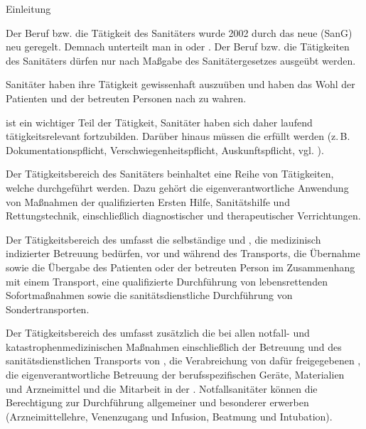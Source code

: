 \Text
{Einleitung}%
{%
Der Beruf bzw. die Tätigkeit des Sanitäters wurde 2002 durch
das neue  (SanG) neu geregelt. Demnach
unterteilt man in  oder
. Der Beruf bzw. die Tätigkeiten des
Sanitäters dürfen nur nach Maßgabe des Sanitätergesetzes
 ausgeübt werden.

Sanitäter haben ihre Tätigkeit 
gewissenhaft auszuüben und haben das Wohl der Patienten und
der betreuten Personen nach
zu wahren.

 ist ein wichtiger Teil der Tätigkeit,
Sanitäter haben sich daher laufend tätigkeitsrelevant
fortzubilden.
Darüber hinaus müssen die  erfüllt werden
(z.\,B. Dokumentationspflicht, Verschwiegenheitspflicht,
Auskunftspflicht, vgl.
).
}%




{Der
Tätigkeitsbereich des Sanitäters beinhaltet eine Reihe von
Tätigkeiten, welche  durchgeführt
werden. Dazu gehört die eigenverantwortliche Anwendung von
Maßnahmen der qualifizierten Ersten Hilfe, Sanitätshilfe und
Rettungstechnik, einschließlich diagnostischer und
therapeutischer Verrichtungen. }


{%
Der Tätigkeitsbereich des
umfasst die
selbständige und , die medizinisch indizierter Betreuung bedürfen,
vor und während des Transports, die Übernahme sowie die
Übergabe des Patienten oder der betreuten Person im
Zusammenhang mit einem Transport, eine qualifizierte
Durchführung von lebensrettenden Sofortmaßnahmen sowie die
sanitätsdienstliche Durchführung von Sondertransporten. } 



{%
Der
Tätigkeitsbereich des 
umfasst
zusätzlich die  bei allen
notfall- und katastrophenmedizinischen Maßnahmen
einschließlich der Betreuung und des sanitätsdienstlichen
Transports von , die Verabreichung von
dafür freigegebenen , die
eigenverantwortliche Betreuung der berufsspezifischen Geräte,
Materialien und Arzneimittel und die Mitarbeit in der
. Notfallsanitäter können die Berechtigung zur
Durchführung allgemeiner und besonderer
 erwerben (Arzneimittellehre,
Venenzugang und Infusion, Beatmung und Intubation). }

